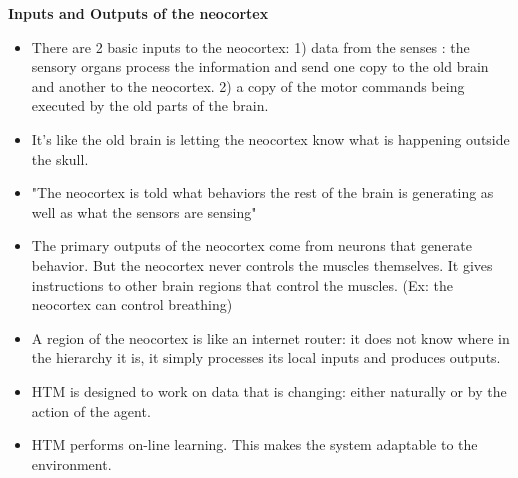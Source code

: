 \documentclass{article}
\begin{document}
\textbf{Inputs and Outputs of the neocortex}
\begin{itemize}
\item There are 2 basic inputs to the neocortex:
    1) data from the senses : the sensory organs process the information and send one copy to the old brain and another to the neocortex.
    2) a copy of the motor commands being executed by the old parts of the brain.
\item It's like the old brain is letting the neocortex know what is happening outside the skull.
\item "The neocortex is told what behaviors the rest of the brain is generating as well as what the sensors are sensing"
\item The primary outputs of the neocortex come from neurons that generate behavior. But the neocortex never controls the muscles themselves. It gives instructions to other brain regions that control the muscles. (Ex: the neocortex can control breathing)
\item A region of the neocortex is like an internet router: it does not know where in the hierarchy it is, it simply processes its local inputs and produces outputs. 
\item HTM is designed to work on data that is changing: either naturally or by the action of the agent.
\item HTM performs on-line learning. This makes the system adaptable to the environment.
\end{itemize}
\end{document}
